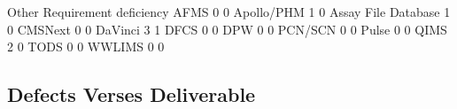 \documentclass{article}
\begin{document}
\begin{Schunk}
\begin{Soutput}
                      Other Requirement deficiency
  AFMS                    0                      0
  Apollo/PHM              1                      0
  Assay File Database     1                      0
  CMSNext                 0                      0
  DaVinci                 3                      1
  DFCS                    0                      0
  DPW                     0                      0
  PCN/SCN                 0                      0
  Pulse                   0                      0
  QIMS                    2                      0
  TODS                    0                      0
  WWLIMS                  0                      0
\end{Soutput}
\end{Schunk}

\subsection{Defects Verses Deliverable}
\end{document}
